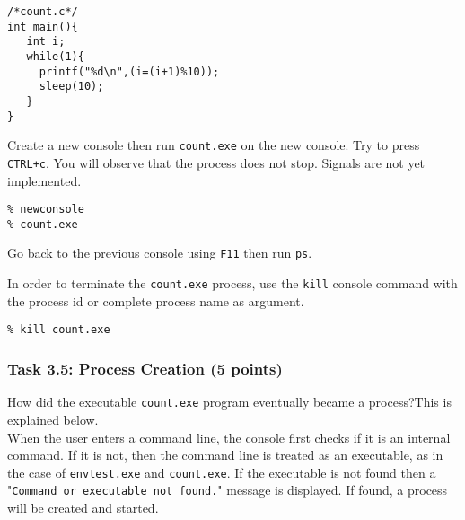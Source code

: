\documentclass[a4paper, 11pt,oneside]{article}
\begin{document}
\begin{verbatim}
/*count.c*/
int main(){
   int i;
   while(1){
     printf("%d\n",(i=(i+1)%10));
     sleep(10);   
   }
}
\end{verbatim}

Create a new console then run \texttt{count.exe} on the new console. Try to press \texttt{CTRL+c}. 
You will observe that the process does not stop. Signals are not yet implemented. 

\begin{verbatim}
% newconsole
% count.exe
\end{verbatim}

Go back to the previous console using \texttt{F11} then run \texttt{ps}.

\noindent{}

In order to terminate the \texttt{count.exe} process, use the \texttt{kill} console command with the 
process id or complete process name as argument.

\begin{verbatim}
% kill count.exe
\end{verbatim}

\subsubsection*{Task 3.5: Process Creation (5 points)}

How did the executable \texttt{count.exe} program eventually became a process?This is explained below.\\

When the user enters a command line, the console first checks if it is an internal command. 
If it is not, then the command line is treated as an executable, as in the case of 
\texttt{envtest.exe} and \texttt{count.exe}. If the executable is not found then a "\texttt{Command or executable not found.}" message is displayed. If found, a process will be created and started. 
\end{document}
